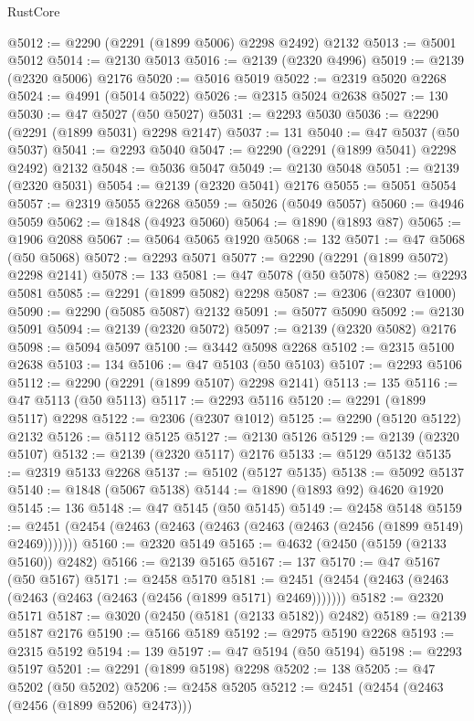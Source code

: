 \begin{lexlean}{RustCore}
\begin{coremodule}
@5012 := @2290 (@2291 (@1899 @5006) @2298 @2492) @2132
@5013 := @5001 @5012
@5014 := @2130 @5013
@5016 := @2139 (@2320 @4996)
@5019 := @2139 (@2320 @5006) @2176
@5020 := @5016 @5019
@5022 := @2319 @5020 @2268
@5024 := @4991 (@5014 @5022)
@5026 := @2315 @5024 @2638
@5027 := 130
@5030 := @47 @5027 (@50 @5027)
@5031 := @2293 @5030
@5036 := @2290 (@2291 (@1899 @5031) @2298 @2147)
@5037 := 131
@5040 := @47 @5037 (@50 @5037)
@5041 := @2293 @5040
@5047 := @2290 (@2291 (@1899 @5041) @2298 @2492) @2132
@5048 := @5036 @5047
@5049 := @2130 @5048
@5051 := @2139 (@2320 @5031)
@5054 := @2139 (@2320 @5041) @2176
@5055 := @5051 @5054
@5057 := @2319 @5055 @2268
@5059 := @5026 (@5049 @5057)
@5060 := @4946 @5059
@5062 := @1848 (@4923 @5060)
@5064 := @1890 (@1893 @87)
@5065 := @1906 @2088
@5067 := @5064 @5065 @1920
@5068 := 132
@5071 := @47 @5068 (@50 @5068)
@5072 := @2293 @5071
@5077 := @2290 (@2291 (@1899 @5072) @2298 @2141)
@5078 := 133
@5081 := @47 @5078 (@50 @5078)
@5082 := @2293 @5081
@5085 := @2291 (@1899 @5082) @2298
@5087 := @2306 (@2307 @1000)
@5090 := @2290 (@5085 @5087) @2132
@5091 := @5077 @5090
@5092 := @2130 @5091
@5094 := @2139 (@2320 @5072)
@5097 := @2139 (@2320 @5082) @2176
@5098 := @5094 @5097
@5100 := @3442 @5098 @2268
@5102 := @2315 @5100 @2638
@5103 := 134
@5106 := @47 @5103 (@50 @5103)
@5107 := @2293 @5106
@5112 := @2290 (@2291 (@1899 @5107) @2298 @2141)
@5113 := 135
@5116 := @47 @5113 (@50 @5113)
@5117 := @2293 @5116
@5120 := @2291 (@1899 @5117) @2298
@5122 := @2306 (@2307 @1012)
@5125 := @2290 (@5120 @5122) @2132
@5126 := @5112 @5125
@5127 := @2130 @5126
@5129 := @2139 (@2320 @5107)
@5132 := @2139 (@2320 @5117) @2176
@5133 := @5129 @5132
@5135 := @2319 @5133 @2268
@5137 := @5102 (@5127 @5135)
@5138 := @5092 @5137
@5140 := @1848 (@5067 @5138)
@5144 := @1890 (@1893 @92) @4620 @1920
@5145 := 136
@5148 := @47 @5145 (@50 @5145)
@5149 := @2458 @5148
@5159 := @2451 (@2454 (@2463 (@2463 (@2463 (@2463 (@2463 (@2456 (@1899 @5149) @2469)))))))
@5160 := @2320 @5149
@5165 := @4632 (@2450 (@5159 (@2133 @5160)) @2482)
@5166 := @2139 @5165
@5167 := 137
@5170 := @47 @5167 (@50 @5167)
@5171 := @2458 @5170
@5181 := @2451 (@2454 (@2463 (@2463 (@2463 (@2463 (@2463 (@2456 (@1899 @5171) @2469)))))))
@5182 := @2320 @5171
@5187 := @3020 (@2450 (@5181 (@2133 @5182)) @2482)
@5189 := @2139 @5187 @2176
@5190 := @5166 @5189
@5192 := @2975 @5190 @2268
@5193 := @2315 @5192
@5194 := 139
@5197 := @47 @5194 (@50 @5194)
@5198 := @2293 @5197
@5201 := @2291 (@1899 @5198) @2298
@5202 := 138
@5205 := @47 @5202 (@50 @5202)
@5206 := @2458 @5205
@5212 := @2451 (@2454 (@2463 (@2456 (@1899 @5206) @2473)))

\end{coremodule}
\end{lexlean}
